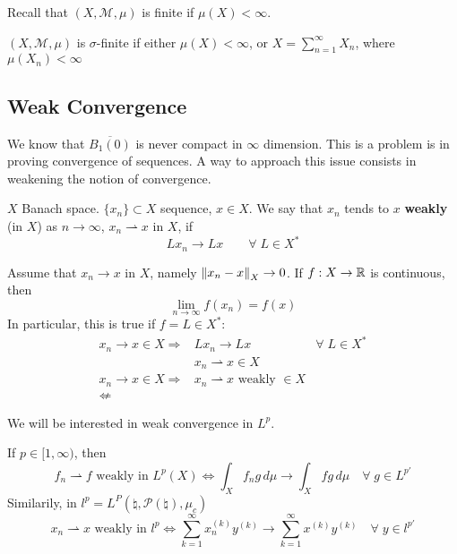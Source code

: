 Recall that \((X, \mathcal{M}, \mu)\) is finite if \(\mu(X) < \infty\).

\begin{definition}
    \((X, \mathcal{M}, \mu)\) is \(\sigma\)-finite if either \(\mu(X) < \infty\), or \(X = \sum_{n=1}^\infty X_n\), where \(\mu(X_n) < \infty\)
\end{definition}

\subsection*{Weak Convergence}

We know that \(\overline{B_1(0)}\) is never compact in \(\infty\) dimension. This is a problem is in proving convergence of sequences. A way to approach this issue consists in weakening the notion of convergence.
\begin{definition}
    \(X\) Banach space. \(\{x_n\} \subset X\) sequence, \(x \in X\). We say that \(x_n\) tends to \(x\) \textbf{weakly} (in \(X\)) as \(n \to \infty\), \(x_n \rightharpoonup x\) in \(X\), if 
    \[
        L x_n \to Lx \qquad \forall \; L \in X^*
    \]
\end{definition}
\begin{remark}
    Assume that \(x_n \to x\) in \(X\), namely \(\norm{x_n -x}_X \to 0\). If \(f:X \to \mathbb{R}\) is continuous, then
    \[
        \lim_{n \to \infty} f(x_n) = f(x)
    \]
    In particular, this is true if \(f = L \in X^*\):
    \[
        \begin{array}{rlc}
            x_n \to x \in X \Rightarrow & L x_n \to Lx & \forall\; L \in X^* \\
            & x_n \rightharpoonup x \in X & \\
            x_n \to x \in X \Rightarrow & x_n \rightharpoonup x \text{ weakly } \in X & \\
             \nLeftarrow & 
        \end{array}
    \]
\end{remark}
\begin{remark}
    We will be interested in weak convergence in \(L^p\). 
    
    \noindent If \(p \in [1, \infty)\), then 
    \[
        f_n \rightharpoonup f \text{ weakly in } L^p(X) \Leftrightarrow \int_X f_n g \, d\mu \to \int_X fg \, d\mu \quad \forall \; g \in L^{p'}
    \]
    \noindent Similarily, in \(l^p = L^P(\natural, \mathcal{P}(\natural), \mu_c)\)
    \[
        x_n \rightharpoonup x \text{ weakly in } l^p \Leftrightarrow \sum_{k=1}^\infty x_n^{(k)} y^{(k)} \to \sum_{k=1}^\infty x^{(k)} y^{(k)} \quad \forall \; y \in l^{p'}
    \]
\end{remark}

